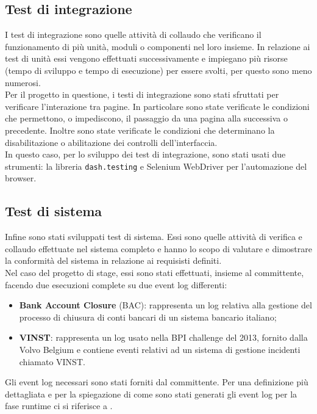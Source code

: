 \subsection{Test di integrazione}
I test di integrazione sono quelle attività di collaudo che verificano il funzionamento di più unità, moduli o componenti nel loro insieme. In relazione ai test di unità essi vengono effettuati successivamente e impiegano più risorse (tempo di sviluppo e tempo di esecuzione) per essere svolti, per questo sono meno numerosi.
\\
Per il progetto in questione, i testi di integrazione sono stati sfruttati per verificare l'interazione tra pagine. In particolare sono state verificate le condizioni che permettono, o impediscono, il passaggio da una pagina alla successiva o precedente. Inoltre sono state verificate le condizioni che determinano la disabilitazione o abilitazione dei controlli dell'interfaccia.
\\
In questo caso, per lo sviluppo dei test di integrazione, sono stati usati due strumenti: la libreria \texttt{dash.testing} e Selenium WebDriver \cite{site:selenium} per l'automazione del browser. 


\subsection{Test di sistema}
Infine sono stati sviluppati test di sistema. Essi sono quelle attività di verifica e collaudo effettuate nel sistema completo e hanno lo scopo di valutare e dimostrare la conformità del sistema in relazione ai requisisti definiti.
\\
Nel caso del progetto di stage, essi sono stati effettuati, insieme al committente, facendo due esecuzioni complete su due event log differenti:

\begin{itemize}
\item \textbf{Bank Account Closure} (BAC): rappresenta un log relativa alla gestione del processo di chiusura di conti bancari di un sistema bancario italiano;

\item \textbf{VINST}: rappresenta un log usato nella BPI challenge del 2013, fornito dalla Volvo Belgium e contiene eventi relativi ad un sistema di gestione incidenti chiamato VINST.

\end{itemize}
Gli event log necessari sono stati forniti dal committente.
Per una definizione più dettagliata e per la spiegazione di come sono stati generati gli event log per la fase runtime ci si riferisce a \cite{paper-padella}.

